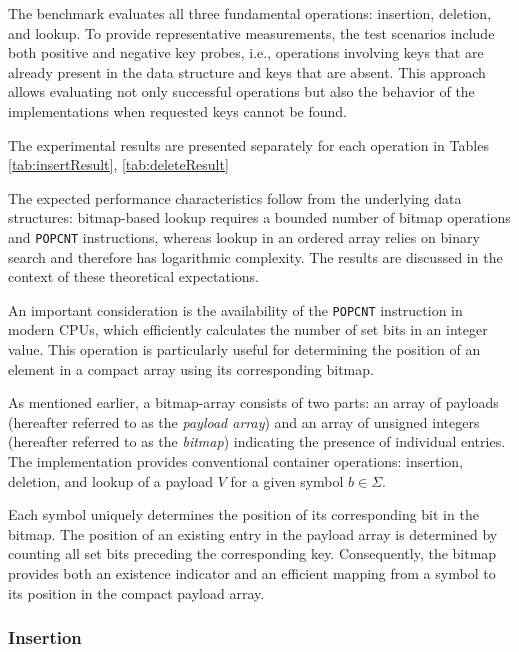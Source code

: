 \documentclass[11pt,twoside]{article}
\begin{document}
    The benchmark evaluates all three fundamental operations: insertion, deletion, and lookup.
    To provide representative measurements, the test scenarios include both positive and
    negative key probes, i.e., operations involving keys that are already present in the data structure
    and keys that are absent. This approach allows evaluating not only successful
    operations but also the behavior of the implementations when requested keys cannot be found.

    The experimental results are presented separately for each operation in Tables
    \ref{tab:insertResult}, \ref{tab:deleteResult}
    
    The expected performance characteristics follow from the underlying data structures:
    bitmap-based lookup requires a bounded number of bitmap operations and \texttt{POPCNT} instructions,
    whereas lookup in an ordered array relies on binary search and therefore has logarithmic complexity.
    The results are discussed in the context of these theoretical expectations.

    An important consideration is the availability of the \texttt{POPCNT}
    instruction in modern CPUs, which efficiently calculates the number
    of set bits in an integer value. This operation is particularly useful
    for determining the position of an element in a compact array using
    its corresponding bitmap.

    As mentioned earlier, a bitmap-array consists of two parts: an array
    of payloads (hereafter referred to as the \textit{payload array}) and
    an array of unsigned integers (hereafter referred to as the
    \textit{bitmap}) indicating the presence of individual entries.
    The implementation provides conventional container operations:
    insertion, deletion, and lookup of a payload $V$ for a given symbol
    $b \in \Sigma$.

    Each symbol uniquely determines the position of its corresponding bit
    in the bitmap. The position of an existing entry in the payload array
    is determined by counting all set bits preceding the corresponding
    key. Consequently, the bitmap provides both an existence indicator
    and an efficient mapping from a symbol to its position in the compact
    payload array.

    \subsubsection{Insertion}
\end{document}
